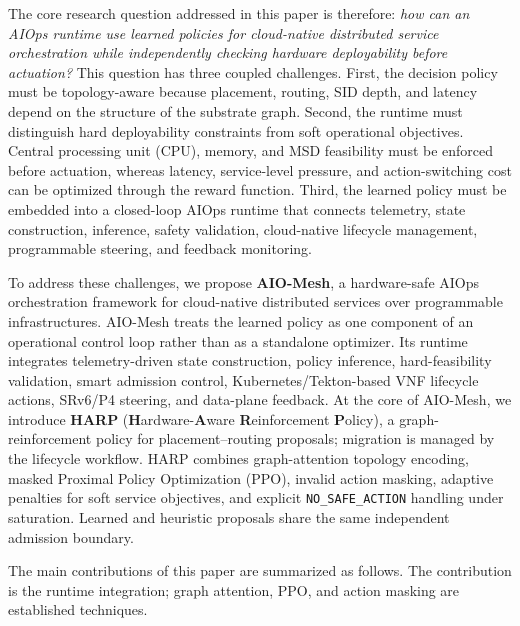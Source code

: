 \documentclass[final,5p]{elsarticle}
\newcommand{\rev}[1]{\textcolor{revisiongreen}{#1}}
\let\newrev\rev
\begin{document}
The core research question addressed in this paper is therefore: \emph{how can an AIOps runtime use learned policies for cloud-native distributed service orchestration while \newrev{independently checking hardware deployability before actuation?}} This question has three coupled challenges. First, the decision policy must be topology-aware because placement, routing, SID depth, and latency depend on the structure of the substrate graph. Second, the runtime must distinguish hard deployability constraints from soft operational objectives. \newrev{Central processing unit (CPU)}, memory, and MSD feasibility must be enforced before actuation, whereas latency, service-level pressure, and \newrev{action-switching cost} can be optimized through the reward function. Third, the learned policy must be embedded into a closed-loop AIOps runtime that connects telemetry, state construction, inference, safety validation, cloud-native lifecycle management, programmable steering, and feedback monitoring.

To address these challenges, we propose \textbf{AIO-Mesh}, a hardware-safe AIOps orchestration framework for cloud-native distributed services over programmable infrastructures. AIO-Mesh treats the learned policy as one component of an operational control loop rather than as a standalone optimizer. Its runtime integrates telemetry-driven state construction, policy inference, hard-feasibility validation, smart admission control, Kubernetes/Tekton-based VNF lifecycle actions, SRv6/P4 steering, and data-plane feedback. At the core of AIO-Mesh, we introduce \textbf{HARP} (\textbf{H}ardware-\textbf{A}ware \textbf{R}einforcement \textbf{P}olicy), a graph-reinforcement policy for \newrev{placement--routing proposals; migration is managed by the lifecycle workflow}. HARP combines graph-attention topology encoding, \newrev{masked Proximal Policy Optimization (PPO)}, invalid action masking, adaptive penalties for soft service objectives, and explicit \texttt{NO\_SAFE\_ACTION} handling under saturation. \newrev{Learned and heuristic proposals share the same independent admission boundary.}

The main contributions of this paper are summarized as follows. \newrev{The contribution is the runtime integration; graph attention, PPO, and action masking are established techniques.}
\end{document}
